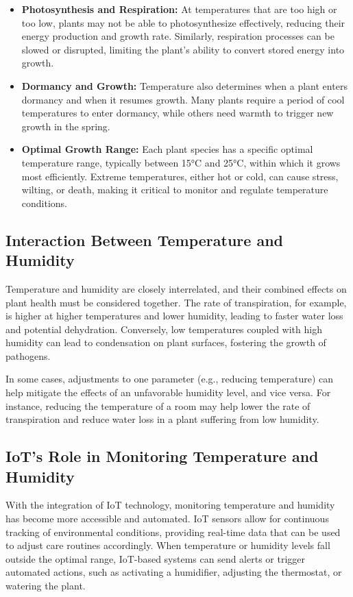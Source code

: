 \documentclass[12pt,a4paper,oneside,english]{book}
\begin{document}
\begin{itemize}
    \item \textbf{Photosynthesis and Respiration:} At temperatures that are too high or too low, plants may not be able to photosynthesize effectively, reducing their energy production and growth rate. Similarly, respiration processes can be slowed or disrupted, limiting the plant's ability to convert stored energy into growth.
    \item \textbf{Dormancy and Growth:} Temperature also determines when a plant enters dormancy and when it resumes growth. Many plants require a period of cool temperatures to enter dormancy, while others need warmth to trigger new growth in the spring.
    \item \textbf{Optimal Growth Range:} Each plant species has a specific optimal temperature range, typically between 15°C and 25°C, within which it grows most efficiently. Extreme temperatures, either hot or cold, can cause stress, wilting, or death, making it critical to monitor and regulate temperature conditions.
\end{itemize}




\subsection{Interaction Between Temperature and Humidity}

Temperature and humidity are closely interrelated, and their combined effects on plant health must be considered together. The rate of transpiration, for example, is higher at higher temperatures and lower humidity, leading to faster water loss and potential dehydration. Conversely, low temperatures coupled with high humidity can lead to condensation on plant surfaces, fostering the growth of pathogens.

In some cases, adjustments to one parameter (e.g., reducing temperature) can help mitigate the effects of an unfavorable humidity level, and vice versa. For instance, reducing the temperature of a room may help lower the rate of transpiration and reduce water loss in a plant suffering from low humidity.

\subsection{IoT's Role in Monitoring Temperature and Humidity}

With the integration of IoT technology, monitoring temperature and humidity has become more accessible and automated. IoT sensors allow for continuous tracking of environmental conditions, providing real-time data that can be used to adjust care routines accordingly. When temperature or humidity levels fall outside the optimal range, IoT-based systems can send alerts or trigger automated actions, such as activating a humidifier, adjusting the thermostat, or watering the plant.
\end{document}
